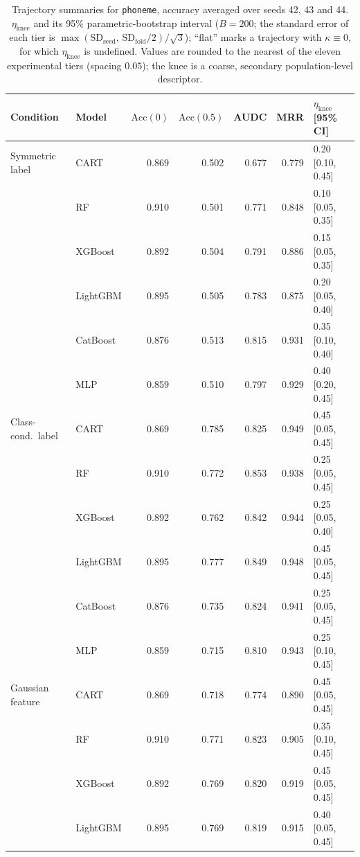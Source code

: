 \documentclass[pdflatex,sn-mathphys]{sn-jnl}
\theoremstyle{thmstyleone}
\begin{document}
\begin{table}[htbp]
\centering
\scriptsize
\setlength{\tabcolsep}{3.5pt}
\caption{Trajectory summaries for \texttt{phoneme}, accuracy averaged over seeds 42, 43 and 44. $\eta_{\mathrm{knee}}$ and its 95\% parametric-bootstrap interval ($B=200$; the standard error of each tier is $\max(\mathrm{SD}_{\mathrm{seed}},\,\mathrm{SD}_{\mathrm{fold}}/2)/\sqrt3$); ``flat'' marks a trajectory with $\kappa\equiv 0$, for which $\eta_{\mathrm{knee}}$ is undefined. Values are rounded to the nearest of the eleven experimental tiers (spacing $0.05$); the knee is a coarse, secondary population-level descriptor.}
\label{tab:traj_phoneme}
\begin{tabular}{@{}llrrrrl@{}}
\toprule
Condition & Model & $\mathrm{Acc}(0)$ & $\mathrm{Acc}(0.5)$ & AUDC & MRR & $\eta_{\mathrm{knee}}$ [95\% CI] \\
\midrule
Symmetric label & CART & 0.869 & 0.502 & 0.677 & 0.779 & 0.20 [0.10, 0.45] \\
 & RF & 0.910 & 0.501 & 0.771 & 0.848 & 0.10 [0.05, 0.35] \\
 & XGBoost & 0.892 & 0.504 & 0.791 & 0.886 & 0.15 [0.05, 0.35] \\
 & LightGBM & 0.895 & 0.505 & 0.783 & 0.875 & 0.20 [0.05, 0.40] \\
 & CatBoost & 0.876 & 0.513 & 0.815 & 0.931 & 0.35 [0.10, 0.40] \\
 & MLP & 0.859 & 0.510 & 0.797 & 0.929 & 0.40 [0.20, 0.45] \\
\midrule
Class-cond.\ label & CART & 0.869 & 0.785 & 0.825 & 0.949 & 0.45 [0.05, 0.45] \\
 & RF & 0.910 & 0.772 & 0.853 & 0.938 & 0.25 [0.05, 0.45] \\
 & XGBoost & 0.892 & 0.762 & 0.842 & 0.944 & 0.25 [0.05, 0.40] \\
 & LightGBM & 0.895 & 0.777 & 0.849 & 0.948 & 0.45 [0.05, 0.45] \\
 & CatBoost & 0.876 & 0.735 & 0.824 & 0.941 & 0.25 [0.05, 0.45] \\
 & MLP & 0.859 & 0.715 & 0.810 & 0.943 & 0.25 [0.10, 0.45] \\
\midrule
Gaussian feature & CART & 0.869 & 0.718 & 0.774 & 0.890 & 0.45 [0.05, 0.45] \\
 & RF & 0.910 & 0.771 & 0.823 & 0.905 & 0.35 [0.10, 0.45] \\
 & XGBoost & 0.892 & 0.769 & 0.820 & 0.919 & 0.45 [0.05, 0.45] \\
 & LightGBM & 0.895 & 0.769 & 0.819 & 0.915 & 0.40 [0.05, 0.45] \\

\end{tabular}
\end{table}
\end{document}
